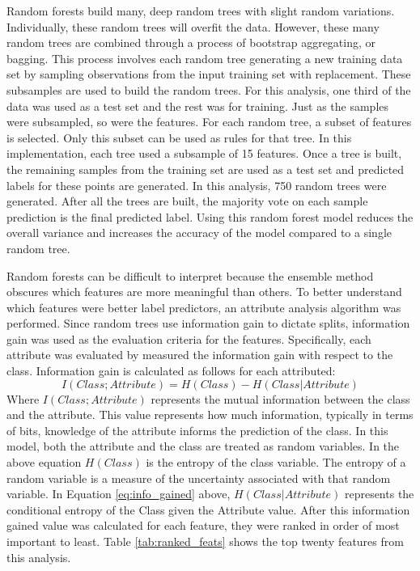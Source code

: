 \documentclass{article}
\begin{document}
Random forests build many, deep random trees with slight random variations.  Individually, these random trees will overfit the data.  However, these many random trees are combined through a process of bootstrap aggregating, or bagging.  This process involves each random tree generating a new training data set by sampling observations from the input training set with replacement.  These subsamples are used to build the random trees.  For this analysis, one third of the data was used as a test set and the rest was for training.  Just as the samples were subsampled, so were the features.  For each random tree, a subset of features is selected.  Only this subset can be used as rules for that tree.  In this implementation, each tree used a subsample of 15 features. Once a tree is built, the remaining samples from the training set are used as a test set and predicted labels for these points are generated. In this analysis, 750 random trees were generated. After all the trees are built, the majority vote on each sample prediction is the final predicted label.  Using this random forest model reduces the overall variance and increases the accuracy of the model compared to a single random tree.
\par
Random forests can be difficult to interpret because the ensemble method obscures which features are more meaningful than others.  To better understand which features were better label predictors, an attribute analysis algorithm was performed.  Since random trees use information gain to dictate splits, information gain was used as the evaluation criteria for the features.  Specifically, each attribute was evaluated by measured the information gain with respect to the class.  Information gain is calculated as follows for each attributed:
\begin{equation}
I(Class; Attribute) = H(Class) - H(Class | Attribute)
\end{equation} \label{eq:info_gained}
Where $I(Class; Attribute)$ represents the mutual information between the class and the attribute.  This value represents how much information, typically in terms of bits, knowledge of the attribute informs the prediction of the class.  In this model, both the attribute and the class are treated as random variables.  In the above equation $H(Class)$ is the entropy of the class variable.  The entropy of a random variable is a measure of the uncertainty associated with that random variable. In Equation \ref{eq:info_gained} above, $H(Class | Attribute)$ represents the conditional entropy of the Class given the Attribute value.  After this information gained value was calculated for each feature, they were ranked in order of most important to least.  Table \ref{tab:ranked_feats} shows the top twenty features from this analysis.
\end{document}

